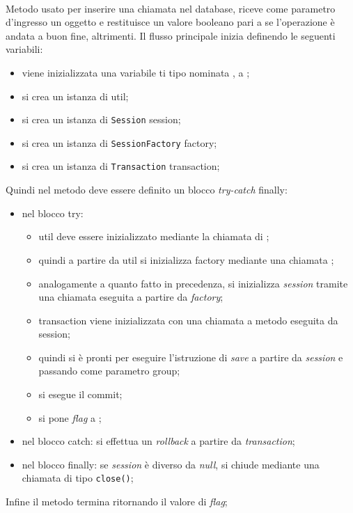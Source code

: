 \begin{description}
	\item{}\\
	Metodo usato per inserire una chiamata nel database, riceve come parametro d'ingresso un oggetto  e restituisce un valore booleano  pari a  se l'operazione è andata a buon fine,  altrimenti. Il flusso principale inizia definendo le seguenti variabili:
	\begin{itemize}
		\item viene inizializzata una variabile ti tipo  nominata , a ;
		\item si crea un istanza di  util;
		\item si crea un istanza di \texttt{Session} session;
		\item si crea un istanza di \texttt{SessionFactory} factory;
		\item si crea un istanza di \texttt{Transaction} transaction;
	\end{itemize}
	Quindi nel metodo deve essere definito un blocco \textit{try-catch} finally:
	\begin{itemize}
		\item nel blocco try:
		\begin{itemize}
			\item util deve essere inizializzato mediante la chiamata  di ;
			\item quindi a partire da util si inizializza factory mediante una chiamata ;
			\item analogamente a quanto fatto in precedenza, si inizializza \textit{session} tramite una chiamata  eseguita a partire da \textit{factory};
			\item transaction viene inizializzata con una chiamata a metodo  eseguita da session;
			\item quindi si è pronti per eseguire l'istruzione di \textit{save} a partire da \textit{session} e passando come parametro group;
			\item si esegue il commit;
			\item si pone \textit{flag} a ;
		\end{itemize}
		\item nel blocco catch: si effettua un \textit{rollback} a partire da \textit{transaction};
		\item nel blocco finally: se \textit{session} è diverso da \textit{null}, si chiude mediante una chiamata di tipo \texttt{close()};
	\end{itemize}
	Infine il metodo termina ritornando il valore di \textit{flag};
	

\end{description}
